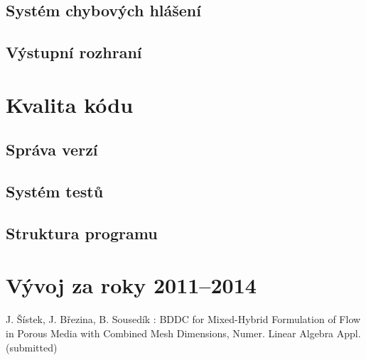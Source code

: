 \documentclass[11pt]{report}
\begin{document}
\subsection{Systém chybových hlášení}
\subsection{Výstupní rozhraní}

\section{Kvalita kódu}
\subsection{Správa verzí}
\subsection{Systém testů}
\subsection{Struktura programu}



\section{Vývoj za roky 2011--2014}

\begin{thebibliography}{99}

J. Šístek, J. Březina, B. Sousedík : BDDC for Mixed-Hybrid 
Formulation of Flow in Porous Media with Combined Mesh Dimensions, Numer. Linear 
Algebra Appl. (submitted)
\end{thebibliography}
\end{document}
